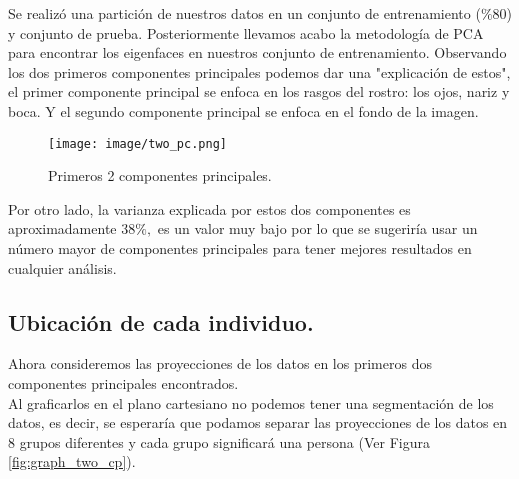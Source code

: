\documentclass[paper=letter, fontsize=11pt]{scrartcl}
\numberwithin{equation}{section} %
\numberwithin{figure}{section} %
\numberwithin{table}{section} %
\begin{document}
Se realizó una partición de nuestros datos en un conjunto de entrenamiento ($\%80$) y conjunto de prueba. Posteriormente llevamos acabo la metodología de PCA para encontrar los eigenfaces en nuestros conjunto de entrenamiento. Observando los dos primeros componentes principales podemos dar una "explicación de estos", el primer componente principal se enfoca en los rasgos del rostro: los ojos, nariz y boca. Y el segundo componente principal se enfoca en el fondo de la imagen.
\begin{figure}[H]
    \centering
    \texttt{[image: image/two\_pc.png]}
    \caption{Primeros 2 componentes principales.}
    \label{fig:two_pc}
\end{figure}
Por otro lado, la varianza explicada por estos dos componentes es aproximadamente $38\%,$ es un valor muy bajo por lo que se sugeriría usar un número mayor de componentes principales para tener mejores resultados en cualquier análisis. 

\subsection{Ubicación de cada individuo.}
Ahora consideremos las proyecciones de los datos en los primeros dos componentes principales encontrados. \\

Al graficarlos en el plano cartesiano no podemos tener una segmentación de los datos, es decir, se esperaría que podamos separar las proyecciones de los datos en 8 grupos diferentes y cada grupo significará una persona (Ver Figura \ref{fig:graph_two_cp}). \\
\end{document}
